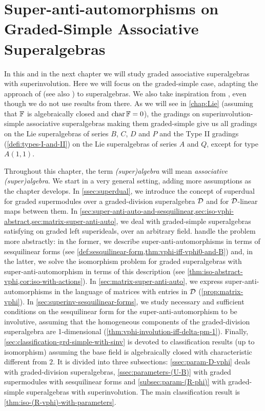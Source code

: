 \chapter{Super-anti-automorphisms on Graded-Simple Associative Superalgebras}\label{chap:super-inv}


In this and in the next chapter we will study graded associative superalgebras with superinvolution. 
Here we will focus on the graded-simple case, adapting the approach of \cite{Eld10} (see also \cite[Section 2.4]{livromicha}) to superalgebras. 
We also take inspiration from \cite{paper-adrian}, even though we do not use results from there. 
As we will see in \cref{chap:Lie} (assuming that $\mathbb{F}$ is algebraically closed and $\operatorname{char} \mathbb{F} = 0$), the gradings on superinvolution-simple associative superalgebras making them graded-simple give us all gradings on the Lie superalgebras of series $B$, $C$, $D$ and $P$ and the Type II gradings (\cref{defi:types-I-and-II}) on the Lie superalgebras of series $A$ and $Q$, except for type $A(1,1)$. 

Throughout this chapter, the term \emph{(super)algebra} will mean \emph{associative (super)algebra}. 
We start in a very general setting, adding more assumptions as the chapter develops. 
In \cref{ssec:superdual}, we introduce the concept of superdual for graded supermodules over a graded-division superalgebra $\mathcal{D}$ and for $\mathcal{D}$-linear maps between them. 
In \cref{sec:super-anti-auto-and-sesquilinear,sec:iso-vphi-abstract,sec:matrix-super-anti-auto}, we deal with graded-simple superalgebras satisfying \dcc on graded left superideals, over an arbitrary field. 
 handle the problem more abstractly: in the former, we describe super-anti-automorphisms in terms of sesquilinear forms (see \cref{def:sesquilinear-form,thm:vphi-iff-vphi0-and-B}) and, in the latter,
we solve the isomorphism problem for graded superalgebras with super-anti-automorphism in terms of this description (see \cref{thm:iso-abstract-vphi,cor:iso-with-actions}). 
In \cref{sec:matrix-super-anti-auto}, we express super-anti-automorphisms in the language of matrices with entries in $\mathcal{D}$ (\cref{prop:matrix-vphi}). 
In \cref{sec:superinv-sesquilinear-forms}, we study necessary and sufficient conditions on the sesquilinear form for the super-anti-automorphism to be involutive, assuming that the homogeneous components of the graded-division superalgebra are 1-dimensional (\cref{thm:vphi-involution-iff-delta-pm-1}). 
Finally, \cref{sec:classification-grd-simple-with-sinv} is devoted to classification results (up to isomorphism) assuming the base field is algebraically closed with characteristic different from $2$. 
It is divided into three subsections: \cref{ssec:param-D-vphi} deals with graded-division superalgebras, \cref{ssec:parameters-(U-B)} with graded supermodules with sesquilinear forms and \cref{subsec:param-(R-phi)} with graded-simple superalgebras with superinvolution. 
The main classification result is \cref{thm:iso-(R-vphi)-with-parameters}. 

